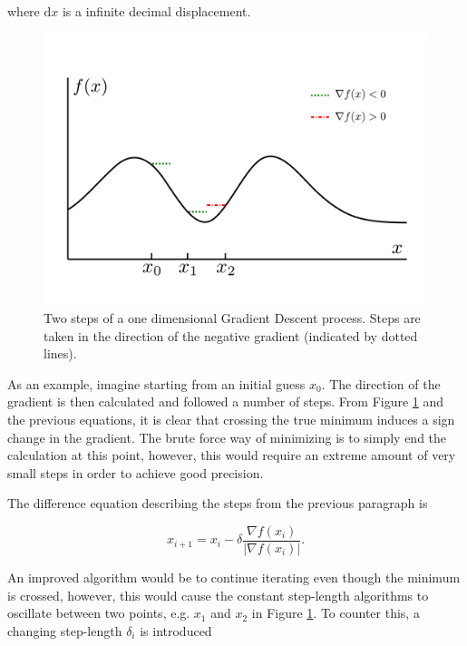 where $\mathrm{d}x$ is a infinite decimal displacement. 

\begin{figure}
 \begin{center}
  \includegraphics[scale=0.3]{../Graphics/SGD.pdf}
  \caption{Two steps of a one dimensional Gradient Descent process. Steps are taken in the direction of the negative gradient (indicated by dotted lines).}
  \label{fig:SGD}
 \end{center}
\end{figure}

As an example, imagine starting from an initial guess $x_0$. The direction of the gradient is then calculated and followed a number of steps. From Figure \ref{fig:SGD} and the previous equations, it is clear that crossing the true minimum induces a sign change in the gradient. The brute force way of minimizing is to simply end the calculation at this point, however, this would require an extreme amount of very small steps in order to achieve good precision. 

The difference equation describing the steps from the previous paragraph is

\begin{equation}
 x_{i+1} = x_i - \delta\frac{\nabla f(x_i)}{|\nabla f(x_i)|}.
\end{equation}


An improved algorithm would be to continue iterating even though the minimum is crossed, however, this would cause the constant step-length algorithms to oscillate between two points, e.g. $x_1$ and $x_2$ in Figure \ref{fig:SGD}. To counter this, a changing step-length $\delta_i$ is introduced


